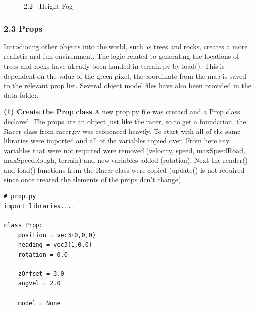 \documentclass[a4 paper, 12pt]{article}
\begin{document}
\begin{figure} [H]
    \caption{2.2 - Height Fog}   
\end{figure}


\subsubsection{2.3 Props}
Introducing other objects into the world, such as trees and rocks, creates a more realistic and fun environment. The logic related to generating the locations of trees and rocks have already been handed in terrain.py by load(). This is dependent on the value of the green pixel, the coordinate from the map is saved to the relevant prop list. Several object model files have also been provided in the data folder.

\textbf{(1) Create the Prop class}
A new prop.py file was created and a Prop class declared. The props are an object just like the racer, so to get a foundation, the Racer class from racer.py was referenced heavily. To start with all of the same libraries were imported and all of the variables copied over. From here any variables that were not required were removed (velocity, speed, maxSpeedRoad, maxSpeedRough, terrain) and new variables added (rotation). Next the render() and load() functions from the Racer class were copied (update() is not required since once created the elements of the props don't change).
    \begin{lstlisting}
# prop.py
import libraries....

class Prop:
    position = vec3(0,0,0)    
    heading = vec3(1,0,0)
    rotation = 0.0

    zOffset = 3.0
    angvel = 2.0
    
    model = None
    \end{lstlisting}
\end{document}
